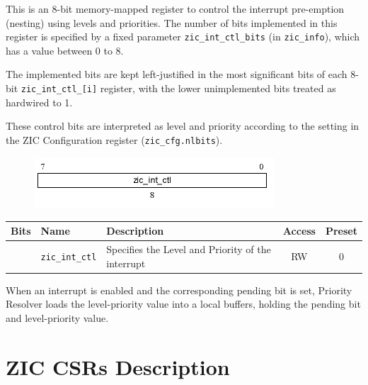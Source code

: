 This is an 8-bit memory-mapped register to control the interrupt pre-emption (nesting) using levels and priorities. The number of bits implemented in this register is specified by a fixed parameter \texttt{zic\_int\_ctl\_bits} (in \texttt{zic\_info}), which has a value between 0 to 8. 

The implemented bits are kept left-justified in the most significant bits of each 8-bit \texttt{zic\_int\_ctl\_[i]} register, with the lower unimplemented bits treated as hardwired to 1.

These control bits are interpreted as level and priority according to the setting in the ZIC
Configuration register (\texttt{zic\_cfg.nlbits}).

\vspace{0.5cm}
\begin{figure}[H]
    \centering
    \includegraphics[width = 9cm]{images/zic_int_ctl.png}
    \label{fig:zic_int_ctl}
\end{figure}
\vspace{0.25cm}

\vspace{0.5cm}
\begin{table}[H]
    \label{tab:zic_int_ctl}
        \centering
        \begin{tabular}{l l p{8cm} c c}
         \hline 
         \textbf{Bits} & \textbf{Name} & \textbf{Description} & \textbf{Access} & \textbf{Preset}\\ \hline \hline
         [7:0] & \texttt{zic\_int\_ctl} & Specifies the Level and Priority of the interrupt & RW & 0\\ \hline
        \end{tabular}
\end{table}
\vspace{0.5cm}

When an interrupt is enabled and the corresponding pending bit is set, Priority Resolver loads the level-priority value into a local buffers, holding the pending bit and level-priority value.

\section{ZIC CSRs Description}
\label{sec:zic-csr-description}

